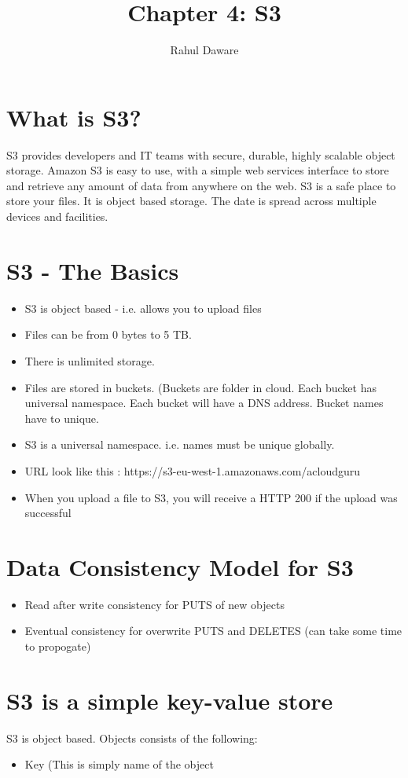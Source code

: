\documentclass{report}
\author{Rahul Daware}
\begin{document}
\title{Chapter 4: S3}
\maketitle

\section*{What is S3?}
S3 provides developers and IT teams with secure, durable, highly scalable object storage. Amazon S3 is easy to use, with a simple web services interface to store and retrieve any amount of data from anywhere on the web. S3 is a safe place to store your files. It is object based storage. The date is spread across multiple devices and facilities.

\section*{S3 - The Basics}
\begin{itemize}
\item
S3 is object based - i.e. allows you to upload files

\item
Files can be from 0 bytes to 5 TB.

\item
There is unlimited storage.

\item
Files are stored in buckets. (Buckets are folder in cloud. Each bucket has universal namespace. Each bucket will have a DNS address. Bucket names have to unique.

\item
S3 is a universal namespace. i.e. names must be unique globally.

\item
URL look like this : https://s3-eu-west-1.amazonaws.com/acloudguru

\item
When you upload a file to S3, you will receive a HTTP 200 if the upload was successful

\end{itemize}

\section*{Data Consistency Model for S3}
\begin{itemize}
\item
Read after write consistency for PUTS of new objects

\item
Eventual consistency for overwrite PUTS and DELETES (can take some time to propogate)
\end{itemize}

\section*{S3 is a simple key-value store}
S3 is object based. Objects consists of the following:
\begin{itemize}
\item
Key (This is simply name of the object
\end{itemize}
\end{document}

